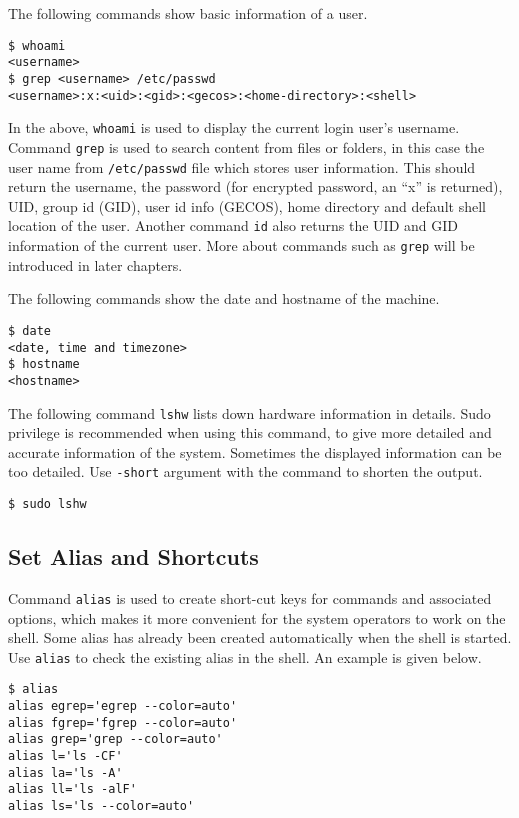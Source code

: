 The following commands show basic information of a user.
\begin{lstlisting}
$ whoami
<username>
$ grep <username> /etc/passwd
<username>:x:<uid>:<gid>:<gecos>:<home-directory>:<shell>
\end{lstlisting}
In the above, \verb|whoami| is used to display the current login user's username. Command \verb|grep| is used to search content from files or folders, in this case the user name from \verb|/etc/passwd| file which stores user information. This should return the username, the password (for encrypted password, an ``x'' is returned), UID, group id (GID), user id info (GECOS), home directory and default shell location of the user.
Another command \verb|id| also returns the UID and GID information of the current user. More about commands such as \verb|grep| will be introduced in later chapters.

The following commands show the date and hostname of the machine.
\begin{lstlisting}
$ date
<date, time and timezone>
$ hostname
<hostname>
\end{lstlisting}

The following command \verb|lshw| lists down hardware information in details. Sudo privilege is recommended when using this command, to give more detailed and accurate information of the system. Sometimes the displayed information can be too detailed. Use \verb|-short| argument with the command to shorten the output.
\begin{lstlisting}
$ sudo lshw
\end{lstlisting}

\subsection{Set Alias and Shortcuts}

Command \verb|alias| is used to create short-cut keys for commands and associated options, which makes it more convenient for the system operators to work on the shell. Some alias has already been created automatically when the shell is started. Use \verb|alias| to check the existing alias in the shell. An example is given below.

\begin{lstlisting}
$ alias
alias egrep='egrep --color=auto'
alias fgrep='fgrep --color=auto'
alias grep='grep --color=auto'
alias l='ls -CF'
alias la='ls -A'
alias ll='ls -alF'
alias ls='ls --color=auto'
\end{lstlisting}

